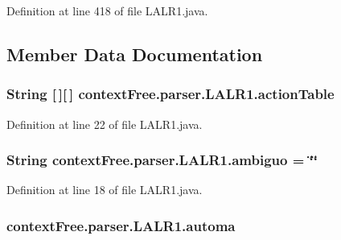 Definition at line 418 of file L\-A\-L\-R1.\-java.



\subsection{Member Data Documentation}
\hypertarget{classcontext_free_1_1parser_1_1_l_a_l_r1_a50a59810900d20102a28766aad917b79}{
\subsubsection[{action\-Table}]{\setlength{\rightskip}{0pt plus 5cm}String \mbox{[}$\,$\mbox{]}\mbox{[}$\,$\mbox{]} {\bf context\-Free.\-parser.\-L\-A\-L\-R1.\-action\-Table}}}\label{classcontext_free_1_1parser_1_1_l_a_l_r1_a50a59810900d20102a28766aad917b79}


Definition at line 22 of file L\-A\-L\-R1.\-java.

\hypertarget{classcontext_free_1_1parser_1_1_l_a_l_r1_ac76b78ae26e1f59674ae10b9c1059213}{
\subsubsection[{ambiguo}]{\setlength{\rightskip}{0pt plus 5cm}String {\bf context\-Free.\-parser.\-L\-A\-L\-R1.\-ambiguo} = \char`\"{}\char`\"{}}}\label{classcontext_free_1_1parser_1_1_l_a_l_r1_ac76b78ae26e1f59674ae10b9c1059213}


Definition at line 18 of file L\-A\-L\-R1.\-java.

\hypertarget{classcontext_free_1_1parser_1_1_l_a_l_r1_ab6054628eaec08e8b3b77a37e219ef02}{
\subsubsection[{automa}]{ {\bf context\-Free.\-parser.\-L\-A\-L\-R1.\-automa}}}\label{classcontext_free_1_1parser_1_1_l_a_l_r1_ab6054628eaec08e8b3b77a37e219ef02}


